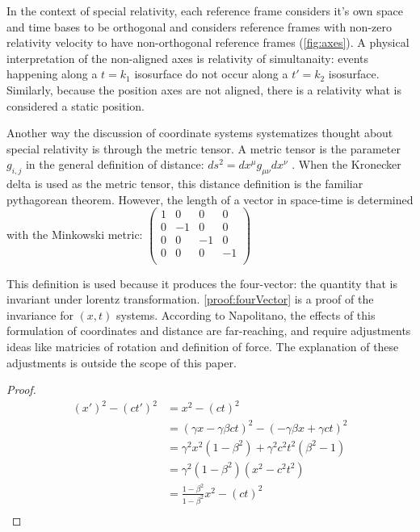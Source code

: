 \documentclass{article}
\begin{document}
In the context of special relativity, each reference frame considers it's own space and time bases to be orthogonal and considers reference frames with non-zero relativity velocity to have non-orthogonal reference frames (\cref{fig:axes}). A physical interpretation of the non-aligned axes is relativity of simultanaity: events happening along a $t=k_1$ isosurface do not occur along a $t'=k_2$ isosurface. Similarly, because the position axes are not aligned, there is a relativity what is considered a static position. 

Another way the discussion of coordinate systems systematizes thought about special relativity is through the metric tensor. A metric tensor is the parameter $g_{i,j}$ in the general definition of distance: $ds^2 = dx^{\mu} g_{\mu \nu} dx^{\nu} $ \cite{napolitano}. When the Kronecker delta is used as the metric tensor, this distance definition is the familiar pythagorean theorem. However, the length of a vector in space-time is determined with the Minkowski metric:
$\begin{pmatrix}
1 & 0 & 0 & 0 \\
0 & -1 & 0 & 0 \\
0 & 0 & -1 & 0 \\
0 & 0 & 0 & -1 \\
\end{pmatrix}$

This definition is used because it produces the four-vector: the quantity that is invariant under lorentz transformation. \cref{proof:fourVector} is a proof of the invariance for $(x,t)$ systems. According to Napolitano, the effects of this formulation of coordinates and distance are far-reaching, and require adjustments ideas like matricies of rotation and definition of force. The explanation of these adjustments is outside the scope of this paper.

\begin{proof}
\begin{align*}
(x')^2 - (c t')^2 &= x^2 - (c t)^2 \\
&= (\gamma x - \gamma \beta c t)^2 - (- \gamma \beta x + \gamma c t)^2  \\
&= \gamma^2 x^2 (1 - \beta^2) + \gamma^2 c^2 t^2 (\beta^2 - 1) \\
&= \gamma^2 (1 - \beta^2) (x^2 - c^2 t^2) \\
&= \frac{1 - \beta^2}{1 - \beta^2} x^2 - (c t)^2 \\
\end{align*}
\label{proof:fourVector}
\end{proof}
\end{document}
